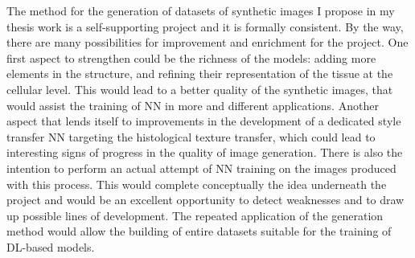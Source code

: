 The method for the generation of datasets of synthetic images I propose in my thesis work is a self-supporting project and it is formally consistent. By the way, there are many possibilities for improvement and enrichment for the project. One first aspect to strengthen could be the richness of the models: adding more elements in the structure, and refining their representation of the tissue at the cellular level. This would lead to a better quality of the synthetic images, that would assist the training of NN in more and different applications. Another aspect that lends itself to improvements in the development of a dedicated style transfer NN targeting the histological texture transfer, which could lead to interesting signs of progress in the quality of image generation. There is also the intention to perform an actual attempt of NN training on the images produced with this process. This would complete conceptually the idea underneath the project and would be an excellent opportunity to detect weaknesses and to draw up possible lines of development. The repeated application of the generation method would allow the building of entire datasets suitable for the training of DL-based models.
